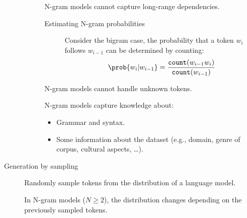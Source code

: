 \begin{description}
\begin{description}
                \begin{remark}
                    N-gram models cannot capture long-range dependencies.
                \end{remark}

                \begin{description}
                    \item[Estimating N-gram probabilities]
                        Consider the bigram case, the probability that a token $w_i$ follows $w_{i-1}$ can be determined by counting:
                        \[ \prob{w_i | w_{i-1}} = \frac{\texttt{count}(w_{i-1} w_i)}{\texttt{count}(w_{i-1})} \]
                \end{description}

                \begin{remark}
                    N-gram models cannot handle unknown tokens.
                \end{remark}

                \begin{remark}
                    N-gram models capture knowledge about:
                    \begin{itemize}
                        \item Grammar and syntax.
                        \item Some information about the dataset (e.g., domain, genre of corpus, cultural aspects, \dots).
                    \end{itemize}
                \end{remark}
        \end{description}

    \item[Generation by sampling] 
        Randomly sample tokens from the distribution of a language model.

        \begin{remark}
            In N-gram models ($N \geq 2$), the distribution changes depending on the previously sampled tokens.
        \end{remark}
\end{description}